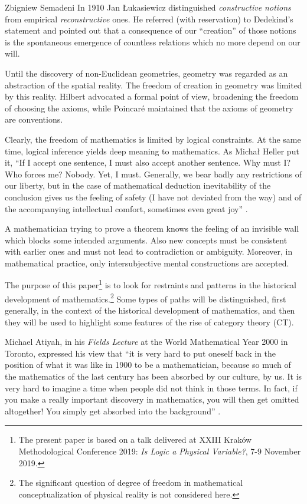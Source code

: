 \begin{artengenv}{Zbigniew Semadeni}
In 1910 Jan Łukasiewicz distinguished \textit{constructive notions} from empirical 
\textit{reconstructive} ones. He referred (with reservation) to Dedekind’s statement 
and pointed out that a consequence of our ``creation'' of those notions is the 
 spontaneous emergence of countless relations which no more depend on our will. 

Until the discovery of non-Euclidean geometries, geometry was regarded as an 
abstraction of the spatial reality. The freedom of creation in geometry was 
limited by this reality. Hilbert advocated a formal point of view, broadening the 
freedom of choosing the axioms, while Poincar\'e maintained that the axioms of 
geometry are conventions.
 
Clearly, the freedom of mathematics is limited by logical constraints. At the same 
time, logical inference yields deep meaning to mathematics. As Michał Heller put it, 
``If I accept one sentence, I must also accept another sentence. Why must I? 
Who forces me? 
Nobody. Yet, I must. Generally, we bear badly any restrictions of our liberty, but 
in the case of mathematical deduction inevitability of the conclusion gives us the 
feeling of safety (I have not deviated from the way) and of the accompanying 
intellectual comfort, sometimes even great joy'' \parencite[p.21]{Heller}. 

A mathematician trying to prove a theorem knows the feeling of an invisible wall 
which blocks some intended arguments. Also new concepts must be consistent with 
earlier ones and must not lead to contradiction or ambiguity. Moreover, in 
mathematical practice, only intersubjective mental constructions are accepted.  

The purpose of this paper\footnote{The present paper is based on a talk delivered 
at XXIII Kraków Methodological Conference 2019: {\it Is Logic a Physical Variable?}, 
7-9 November 2019.} %
is to look for restraints and patterns in the historical development of 
mathematics.\footnote{ The significant question of degree of freedom in mathematical 
conceptualization of physical reality is not considered here.}  %
Some types of paths will be distinguished, first generally, in the context of 
the historical development of mathematics, and then they will be used to highlight 
some features of the rise of category theory (CT). 

Michael Atiyah, in his \textit{Fields Lecture} at the World Mathematical Year 2000 
in Toronto, expressed his view that ``it is very hard to put oneself back in 
the position of what it was like in 1900 to be a mathematician, because so much 
of the mathematics of the last century has been absorbed by our culture, by us. 
It is very hard to imagine a time when people did not think in those terms. In fact, 
if you make a really important discovery in mathematics, you will then get omitted 
altogether! You simply get absorbed into the background'' \parencite[p.1]{Atiyah}. 


\end{artengenv}
